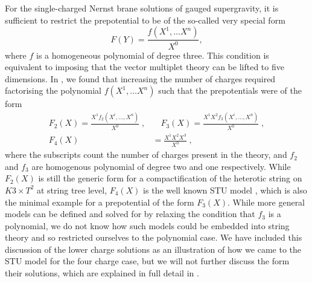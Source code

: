 For the single-charged Nernst brane solutions \cite{Dempster:2015} of gauged supergravity, it is sufficient to restrict the prepotential to be of the so-called very special form
\begin{equation}
\label{eq:veryspecial}
F(Y) = \frac{f(X^1,\ldots X^n)}{X^0} ,
\end{equation}
where $f$ is a homogeneous polynomial of degree three. This condition is equivalent to imposing that the vector multiplet theory can be lifted to five dimensions. In \cite{Gutowski:2019iyo}, we found that increasing the number of charges required factorising the polynomial $f(X^1,\ldots X^n)$ such that the prepotentials were of the form
\begin{equation}
\label{prepotentials}
\begin{aligned}
    F_2(X) = \frac{X^1 f_2(X^i,\ldots,X^n)}{X^0}\;,
    & \quad F_3(X) = \frac{X^1 X^2 f_3(X^i,\ldots,X^n)}{X^0}\;,
     \\ F_4(X) &= \frac{X^1 X^2 X^3}{X^0} \;,
\end{aligned}
\end{equation}
where the subscripts count the number of charges present in the theory, and $f_2$ and $f_3$ are homogenous polynomial of degree two and one respectively. While $F_2(X)$ is still the generic form for a compactification of the heterotic string on $K3 \times T^2$ at string tree level, $F_4(X)$ is the well known STU model \cite{Duff:1995sm}, which is also the minimal example for a prepotential of the form $F_3(X)$. While more general models can be defined and solved for by relaxing the condition that $f_3$ is a polynomial, we do not know how such models could be embedded into string theory and so restricted ourselves to the polynomial case. We have included this discussion of the lower charge solutions as an illustration of how we came to the STU model for the four charge case, but we will not further discuss the form their solutions, which are explained in full detail in \cite{Gutowski:2019iyo}.

